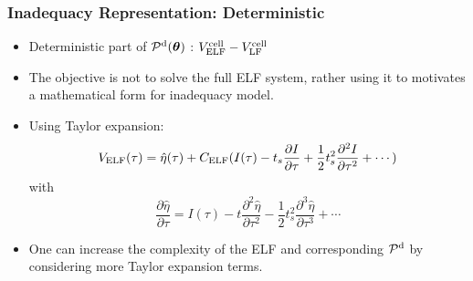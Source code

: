 \documentclass[10pt,xcolor=dvipsnames,compress]{beamer}
\begin{document}
\begin{frame}
\frametitle{Inadequacy Representation: Deterministic}
\vfill

\begin{itemize}
\item Deterministic part of $\mathcal{P}^{\rm d}(\boldsymbol{\theta})$ :
$V^{\rm cell}_{\rm ELF} -  V^{\rm cell}_{\rm LF}$

\item The objective is not to solve the full ELF system, rather using it to motivates a mathematical form for inadequacy model.

\item Using Taylor expansion:
\begin{equation*}
V_{\rm ELF}(\tau) = \hat{\eta}(\tau) + C_{\rm ELF} (
I(\tau) - t_s \frac{\partial I}{\partial \tau} + \frac{1}{2} t_s^2 \frac{\partial^2 I}{\partial \tau^2} + \cdots
)
\end{equation*}
 with
\begin{equation*}
\frac{\partial{\hat{\eta}}}{\partial\tau} = I(\tau) - t  \frac{\partial^2{\hat{\eta}}}{\partial\tau^2} - \frac{1}{2} t_s^2 \frac{\partial^3{\hat{\eta}}}{\partial\tau^3} + \cdots
\end{equation*}


\item One can increase the complexity of the ELF and corresponding $\mathcal{P}^{\rm d}$ by considering more Taylor expansion terms.

\end{itemize}



\vfill
\end{frame}
\end{document}
